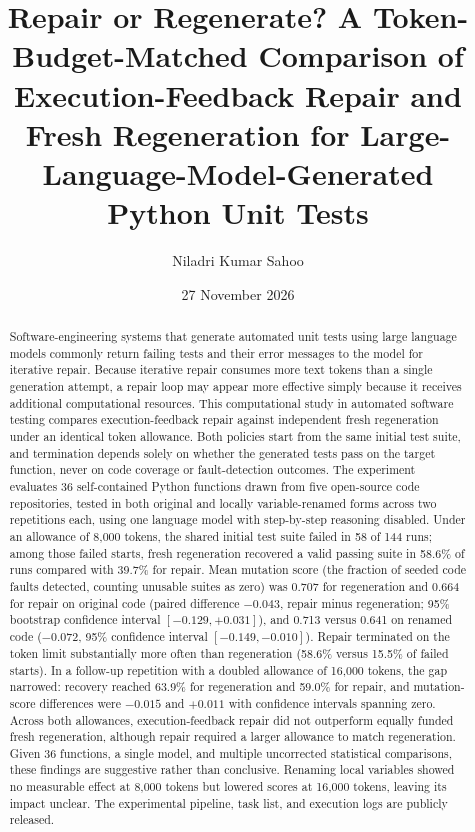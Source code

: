 \documentclass[11pt,a4paper]{article}
\title{Repair or Regenerate? A Token-Budget-Matched Comparison of Execution-Feedback Repair and Fresh Regeneration for Large-Language-Model-Generated Python Unit Tests}
\author{Niladri Kumar Sahoo}
\date{27 November 2026}
\begin{document}
\maketitle

\begin{abstract}
Software-engineering systems that generate automated unit tests using large language models commonly return failing tests and their error messages to the model for iterative repair. Because iterative repair consumes more text tokens than a single generation attempt, a repair loop may appear more effective simply because it receives additional computational resources. This computational study in automated software testing compares execution-feedback repair against independent fresh regeneration under an identical token allowance. Both policies start from the same initial test suite, and termination depends solely on whether the generated tests pass on the target function, never on code coverage or fault-detection outcomes. The experiment evaluates 36 self-contained Python functions drawn from five open-source code repositories, tested in both original and locally variable-renamed forms across two repetitions each, using one language model with step-by-step reasoning disabled. Under an allowance of 8{,}000 tokens, the shared initial test suite failed in 58 of 144 runs; among those failed starts, fresh regeneration recovered a valid passing suite in 58.6\% of runs compared with 39.7\% for repair. Mean mutation score (the fraction of seeded code faults detected, counting unusable suites as zero) was 0.707 for regeneration and 0.664 for repair on original code (paired difference $-0.043$, repair minus regeneration; 95\% bootstrap confidence interval $[-0.129, +0.031]$), and 0.713 versus 0.641 on renamed code ($-0.072$, 95\% confidence interval $[-0.149, -0.010]$). Repair terminated on the token limit substantially more often than regeneration (58.6\% versus 15.5\% of failed starts). In a follow-up repetition with a doubled allowance of 16{,}000 tokens, the gap narrowed: recovery reached 63.9\% for regeneration and 59.0\% for repair, and mutation-score differences were $-0.015$ and $+0.011$ with confidence intervals spanning zero. Across both allowances, execution-feedback repair did not outperform equally funded fresh regeneration, although repair required a larger allowance to match regeneration. Given 36 functions, a single model, and multiple uncorrected statistical comparisons, these findings are suggestive rather than conclusive. Renaming local variables showed no measurable effect at 8{,}000 tokens but lowered scores at 16{,}000 tokens, leaving its impact unclear. The experimental pipeline, task list, and execution logs are publicly released.
\end{abstract}
\end{document}
